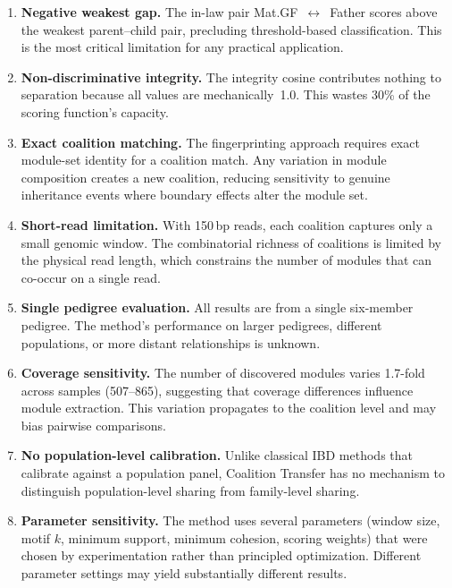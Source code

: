\documentclass{../yalumba}
\begin{document}
\begin{enumerate}
  \item \textbf{Negative weakest gap.}  The in-law pair
        Mat.GF~$\leftrightarrow$~Father scores above the weakest parent--child
        pair, precluding threshold-based classification.  This is the most
        critical limitation for any practical application.

  \item \textbf{Non-discriminative integrity.}  The integrity cosine contributes
        nothing to separation because all values are mechanically~1.0.  This
        wastes 30\% of the scoring function's capacity.

  \item \textbf{Exact coalition matching.}  The fingerprinting approach requires
        exact module-set identity for a coalition match.  Any variation in
        module composition creates a new coalition, reducing sensitivity to
        genuine inheritance events where boundary effects alter the module set.

  \item \textbf{Short-read limitation.}  With 150\,bp reads, each coalition
        captures only a small genomic window.  The combinatorial richness of
        coalitions is limited by the physical read length, which constrains
        the number of modules that can co-occur on a single read.

  \item \textbf{Single pedigree evaluation.}  All results are from a single
        six-member pedigree.  The method's performance on larger pedigrees,
        different populations, or more distant relationships is unknown.

  \item \textbf{Coverage sensitivity.}  The number of discovered modules
        varies 1.7-fold across samples (507--865), suggesting that coverage
        differences influence module extraction.  This variation propagates
        to the coalition level and may bias pairwise comparisons.

  \item \textbf{No population-level calibration.}  Unlike classical IBD
        methods that calibrate against a population panel, Coalition Transfer
        has no mechanism to distinguish population-level sharing from
        family-level sharing.

  \item \textbf{Parameter sensitivity.}  The method uses several parameters
        (window size, motif $k$, minimum support, minimum cohesion, scoring
        weights) that were chosen by experimentation rather than principled
        optimization.  Different parameter settings may yield substantially
        different results.
\end{enumerate}
\end{document}
